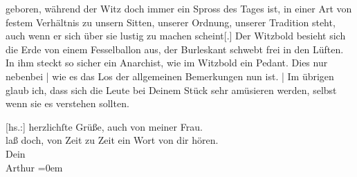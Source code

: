                geboren, während der Witz doch immer ein Spross des Tages ist, in einer Art von
               festem Verhältnis zu unsern Sitten, unserer Ordnung, unserer Tradition steht, auch
               wenn er sich über sie lustig zu machen scheint{[}.{]} Der Witz\introOben{}bold\introOben{} besieht sich die Erde von einem Fesselballon aus, der
               Burleskant schwebt frei in den Lüften. In ihm steckt so sicher ein Anarchist, wie im
               Witzbold ein Pedant. Dies nur nebenbei | wie es das Los der allgemeinen Bemerkungen
               nun ist. | Im übrigen glaub ich, dass sich die Leute bei Deinem Stück sehr amüsieren
               werden, selbst wenn sie es verstehen sollten.\pend
           
\pstart
           {[}hs.:{]} herzlichſte Grüße, auch von meiner Frau.{\\[\baselineskip]}laß doch, von Zeit zu Zeit ein Wort von dir hören.{\\[\baselineskip]}Dein{\\[\baselineskip]}\spacefill\mbox{Arthur}\pend
           \leftskip=0em{}\endnumbering{}  
      